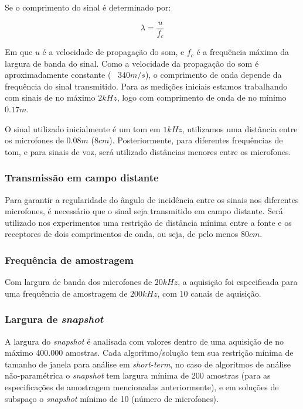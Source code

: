 \documentclass[a4paper,oneside,12pt]{article}
\begin{document}
Se o comprimento do sinal é determinado por:

\begin{equation}
\lambda = \frac{u}{f_c}
\end{equation}

Em que $u$ é a velocidade de propagação do som, e $f_c$ é a frequência máxima da largura de banda do sinal. Como a velocidade da propagação do som é aproximadamente constante (~ $340 m/s$), o comprimento de onda depende da frequência do sinal transmitido. Para as medições iniciais estamos trabalhando com sinais de no máximo $2 kHz$, logo com comprimento de onda de no mínimo $0.17 m$.

O sinal utilizado inicialmente é um tom em $1kHz$, utilizamos uma distância entre os microfones de $0.08 m$ ($8cm$). Posteriormente, para diferentes frequências de tom, e para sinais de voz, será utilizado distâncias menores entre os microfones.

\subsubsection{Transmissão em campo distante}

Para garantir a regularidade do ângulo de incidência entre os sinais nos diferentes microfones, é necessário que o sinal seja transmitido em campo distante. Será utilizado nos experimentos uma restrição de distância mínima entre a fonte e os receptores de dois comprimentos de onda, ou seja, de pelo menos $80 cm$.

\subsubsection{Frequência de amostragem}

Com largura de banda dos microfones de $20kHz$, a aquisição foi especificada para uma frequência de amostragem de $200kHz$, com 10 canais de aquisição.

\subsubsection{Largura de \emph{snapshot}}

A largura do \emph{snapshot} é analisada com valores dentro de uma aquisição de no máximo 400.000 amostras. Cada algoritmo/solução tem sua restrição mínima de tamanho de janela para análise em \emph{short-term}, no caso de algoritmos de análise não-paramétrica o \emph{snapshot} tem largura mínima de 200 amostras (para as especificações de amostragem mencionadas anteriormente), e em soluções de subspaço o \emph{snapshot} mínimo de 10 (número de microfones).
\end{document}
